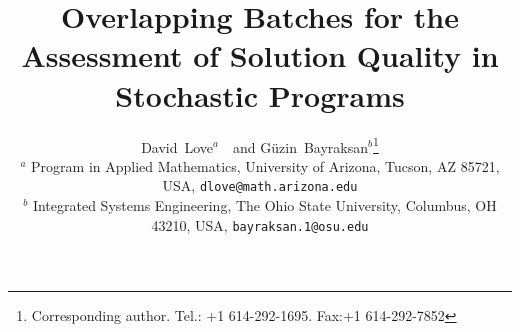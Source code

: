 \documentclass[11pt]{article}
\begin{document}
\title{Overlapping Batches for the Assessment of Solution Quality in Stochastic Programs}

\author{David~Love$^{a}$\ \ and G\"{u}zin~Bayraksan$^{b}$\thanks{Corresponding author. Tel.: +1 614-292-1695. Fax:+1 614-292-7852}\\[6pt]
{\small
      $^{a}$ Program in Applied Mathematics, University of Arizona, Tucson, AZ 85721, USA, \texttt{dlove@math.arizona.edu}} \\
{\small 
      $^{b}$ Integrated Systems Engineering, The Ohio State University, Columbus, OH 43210, USA, \texttt{bayraksan.1@osu.edu}}}



\date{}

\maketitle
\end{document}
